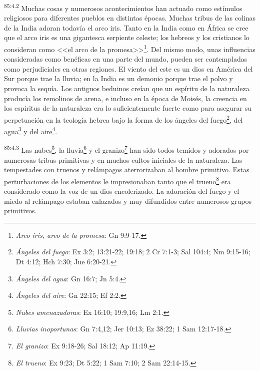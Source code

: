 \par
\textsuperscript{85:4.2} Muchas cosas y numerosos acontecimientos han actuado como estímulos religiosos para diferentes pueblos en distintas épocas. Muchas tribus de las colinas de la India adoran todavía el arco iris. Tanto en la India como en África se cree que el arco iris es una gigantesca serpiente celeste; los hebreos y los cristianos lo consideran como <<el arco de la promesa>>\footnote{\textit{Arco iris, arco de la promesa}: Gn 9:9-17.}. Del mismo modo, unas influencias consideradas como benéficas en una parte del mundo, pueden ser contempladas como perjudiciales en otras regiones. El viento del este es un dios en América del Sur porque trae la lluvia; en la India es un demonio porque trae el polvo y provoca la sequía. Los antiguos beduinos creían que un espíritu de la naturaleza producía los remolinos de arena, e incluso en la época de Moisés, la creencia en los espíritus de la naturaleza era lo suficientemente fuerte como para asegurar su perpetuación en la teología hebrea bajo la forma de los ángeles del fuego\footnote{\textit{Ángeles del fuego}: Ex 3:2; 13:21-22; 19:18; 2 Cr 7:1-3; Sal 104:4; Nm 9:15-16; Dt 4:12; Hch 7:30; Jue 6:20-21.}, del agua\footnote{\textit{Ángeles del agua}: Gn 16:7; Jn 5:4.} y del aire\footnote{\textit{Ángeles del aire}: Gn 22:15; Ef 2:2.}.

\par
\textsuperscript{85:4.3} Las nubes\footnote{\textit{Nubes amenazadoras}: Ex 16:10; 19:9,16; Lm 2:1.}, la lluvia\footnote{\textit{Lluvias inoportunas}: Gn 7:4,12; Jer 10:13; Ez 38:22; 1 Sam 12:17-18.} y el granizo\footnote{\textit{El granizo}: Ex 9:18-26; Sal 18:12; Ap 11:19.} han sido todos temidos y adorados por numerosas tribus primitivas y en muchos cultos iniciales de la naturaleza. Las tempestades con truenos y relámpagos aterrorizaban al hombre primitivo. Estas perturbaciones de los elementos le impresionaban tanto que el trueno\footnote{\textit{El trueno}: Ex 9:23; Dt 5:22; 1 Sam 7:10; 2 Sam 22:14-15.} era considerado como la voz de un dios encolerizado. La adoración del fuego y el miedo al relámpago estaban enlazados y muy difundidos entre numerosos grupos primitivos.

